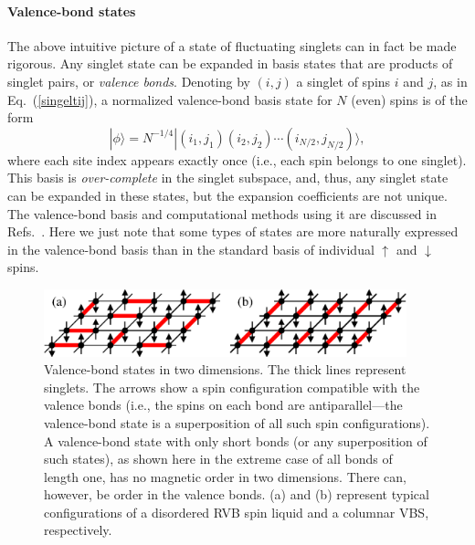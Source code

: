 \documentclass[draft,numberedheadings]{aipproc}
\newcommand{\dn}{\downarrow}
\newcommand{\up}{\uparrow}
\begin{document}
\paragraph{Valence-bond states}

The above intuitive picture of a state of fluctuating singlets can in fact be made rigorous. Any singlet state can be expanded in basis states that are 
products of singlet pairs, or {\it valence bonds}. Denoting by $(i,j)$ a singlet of spins $i$ and $j$, as in Eq.~(\ref{singeltij}), a normalized 
valence-bond basis state  for $N$ (even) spins is of the form 
\begin{equation}
|\phi\rangle = N^{-1/4}|(i_1,j_1)(i_2,j_2)\cdots (i_{N/2},j_{N/2})\rangle,
\label{psivbprod}
\end{equation}
where each site index appears exactly once (i.e., each spin belongs to one singlet). This basis is {\it over-complete} in the singlet subspace, and, 
thus, any singlet state can be expanded in these states, but the expansion coefficients are not unique. The valence-bond basis and computational methods
using it are discussed in Refs.~\cite{vbmethod1,vbbasis,vbmethod2,awshg}. Here we just note that some types of states are more naturally expressed in the
valence-bond basis than in the standard basis of individual $\up$ and $\dn$ spins.

\begin{figure}
\includegraphics[width=10.5cm, clip]{rvb.eps}
\caption{Valence-bond states in two dimensions. The thick lines represent singlets. The arrows show a spin configuration compatible 
with the valence bonds (i.e., the spins on each bond are antiparallel---the valence-bond state is a superposition of all such spin
configurations). A valence-bond state with only short bonds (or any superposition of such states), as shown here in the extreme case 
of all bonds of length one, has no magnetic order in two dimensions. There can, however, be order in the valence bonds. (a) and (b) 
represent typical configurations of a disordered RVB spin liquid and a columnar VBS, respectively.} 
\label{rvbfig}
\end{figure}
\end{document}
